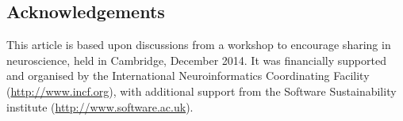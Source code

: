 \documentclass[11pt]{article}
\begin{document}
\subsection*{Acknowledgements}

This article is based upon discussions from a workshop to encourage
sharing in neuroscience, held in Cambridge, December 2014.  It was
financially supported and organised by the International
Neuroinformatics Coordinating Facility (\url{http://www.incf.org}),
with additional support from the Software Sustainability institute
(\url{http://www.software.ac.uk}).


\printbibliography
\end{document}

